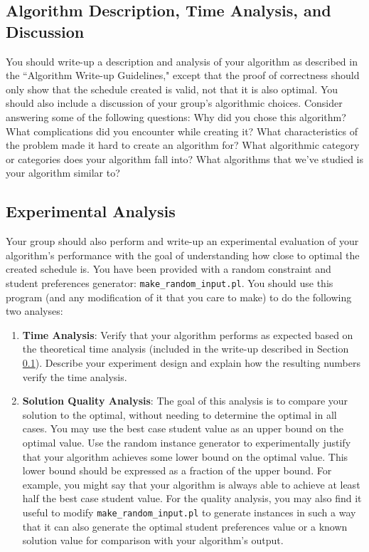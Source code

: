 \documentclass[12pt]{article}
\begin{document}
\subsection{Algorithm Description, Time Analysis, and Discussion}
\label{theory_analysis}
You should write-up a description and analysis of your algorithm as described in the ``Algorithm Write-up Guidelines," except that the proof of correctness should only show that the schedule created is valid, not that it is also optimal. You should also include a discussion of your group's algorithmic choices. Consider answering some of the following questions: Why did you chose this algorithm? What complications did you encounter while creating it? What characteristics of the problem made it hard to create an algorithm for? What algorithmic category or categories does your algorithm fall into? What algorithms that we've studied is your algorithm similar to?

\subsection{Experimental Analysis}
\label{exp_analysis}
Your group should also perform and write-up an experimental evaluation of your algorithm's performance with the goal of understanding how close to optimal the created schedule is. You have been provided with a random constraint and student preferences generator: \texttt{make\_random\_input.pl}. You should use this program (and any modification of it that you care to make) to do the following two analyses:

\begin{enumerate}
\item \textbf{Time Analysis}: Verify that your algorithm performs as expected based on the theoretical time analysis (included in the write-up described in Section \ref{theory_analysis}). Describe your experiment design and explain how the resulting numbers verify the time analysis.
\item \textbf{Solution Quality Analysis}: The goal of this analysis is to compare your solution to the optimal, without needing to determine the optimal in all cases. You may use the best case student value as an upper bound on the optimal value. Use the random instance generator to experimentally justify that your algorithm achieves some lower bound on the optimal value. This lower bound should be expressed as a fraction of the upper bound. For example, you might say that your algorithm is always able to achieve at least half the best case student value. For the quality analysis, you may also find it useful to modify \texttt{make\_random\_input.pl} to generate instances in such a way that it can also generate the optimal student preferences value or a known solution value for comparison with your algorithm's output.
\end{enumerate}
\end{document}
